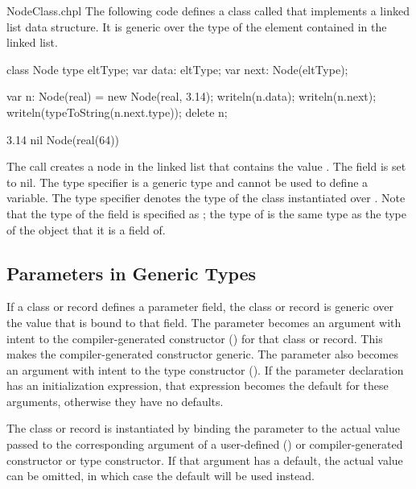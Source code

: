 \begin{chapelexample}{NodeClass.chpl}
The following code defines a class called  that implements
a linked list data structure.  It is generic over the type of the
element contained in the linked list.
\begin{chapel}
class Node {
  type eltType;
  var data: eltType;
  var next: Node(eltType);
}
\end{chapel}
\begin{chapelpost}
var n: Node(real) = new Node(real, 3.14);
writeln(n.data);
writeln(n.next);
writeln(typeToString(n.next.type));
delete n;
\end{chapelpost}
\begin{chapeloutput}
3.14
nil
Node(real(64))
\end{chapeloutput}
The call  creates a node in the linked list
that contains the value .  The  field is set to
nil.  The type specifier  is a generic type and cannot be
used to define a variable.  The type specifier 
denotes the type of the  class instantiated over
.  Note that the type of the  field is specified
as ; the type of  is the same type as
the type of the object that it is a field of.
\end{chapelexample}

\subsection{Parameters in Generic Types}
\label{Parameters_in_Generic_Types}

If a class or record defines a parameter field, the class or record
is generic over the value that is bound to that field.
The parameter becomes an argument with intent  to the
compiler-generated constructor ()
for that class or record.  This makes the compiler-generated
constructor generic.  The parameter also becomes an argument
with intent  to the type  constructor ().
If the parameter declaration has an initialization expression, that expression
becomes the default for these arguments, otherwise they have no defaults.

The class or record is instantiated by binding the parameter
to the actual value passed to the corresponding argument of
a user-defined ()
or compiler-generated constructor or type constructor.
If that argument has a default, the actual value can be omitted, in
which case the default will be used instead.

